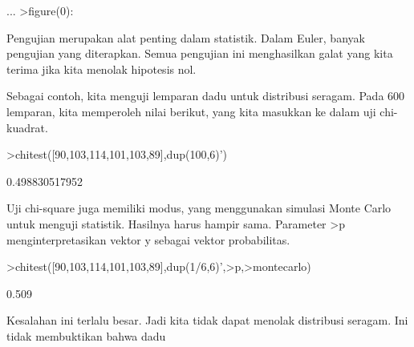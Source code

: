 \documentclass[a4paper,10pt]{article}
\begin{document}
\begin{eulernotebook}
\begin{eulercomment}
\begin{eulercomment}
\begin{eulercomment}
\begin{eulercomment}
\begin{eulercomment}
\begin{eulercomment}
\begin{eulercomment}
\begin{eulercomment}
\begin{eulercomment}
\begin{eulercomment}
\begin{eulercomment}
\begin{eulercomment}
\begin{eulercomment}
\begin{eulercomment}
\begin{eulercomment}
\begin{eulercomment}
\begin{eulercomment}
\begin{eulercomment}
\begin{eulercomment}
\begin{eulercomment}
\begin{eulercomment}
\begin{eulercomment}
\begin{eulercomment}
\begin{eulercomment}
\begin{eulercomment}
\begin{eulercomment}
\begin{eulercomment}
\begin{eulercomment}
\begin{eulercomment}
\begin{eulercomment}
\begin{eulercomment}
\begin{eulercomment}
\begin{eulercomment}
\begin{eulercomment}
\begin{eulercomment}
\begin{eulercomment}
\begin{eulercomment}
\begin{eulercomment}
\begin{eulercomment}
\begin{eulercomment}
\begin{eulercomment}
\begin{eulercomment}
\begin{eulercomment}
\begin{eulercomment}
\begin{eulercomment}
\begin{eulercomment}
\begin{eulercomment}
\begin{eulercomment}
\begin{eulercomment}
\begin{eulercomment}
\begin{eulercomment}
\begin{eulercomment}
\begin{eulercomment}
\begin{eulercomment}
\begin{eulercomment}
\begin{eulercomment}
\begin{eulercomment}
\begin{eulercomment}
\begin{eulercomment}
\begin{eulercomment}
\begin{eulercomment}
\begin{eulercomment}
\begin{eulercomment}
\begin{eulercomment}
\begin{eulercomment}
\begin{eulercomment}
\begin{eulerprompt}
...
>figure(0):
\end{eulerprompt}
\begin{eulercomment}
Pengujian merupakan alat penting dalam statistik. Dalam Euler, banyak
pengujian yang diterapkan. Semua pengujian ini menghasilkan galat yang
kita terima jika kita menolak hipotesis nol.

Sebagai contoh, kita menguji lemparan dadu untuk distribusi seragam.
Pada 600 lemparan, kita memperoleh nilai berikut, yang kita masukkan
ke dalam uji chi-kuadrat.
\end{eulercomment}
\begin{eulerprompt}
>chitest([90,103,114,101,103,89],dup(100,6)')
\end{eulerprompt}
\begin{euleroutput}
  0.498830517952
\end{euleroutput}
\begin{eulercomment}
Uji chi-square juga memiliki modus, yang menggunakan simulasi Monte
Carlo untuk menguji statistik. Hasilnya harus hampir sama. Parameter
\textgreater{}p menginterpretasikan vektor y sebagai vektor probabilitas.
\end{eulercomment}
\begin{eulerprompt}
>chitest([90,103,114,101,103,89],dup(1/6,6)',>p,>montecarlo)
\end{eulerprompt}
\begin{euleroutput}
  0.509
\end{euleroutput}
\begin{eulercomment}
Kesalahan ini terlalu besar. Jadi kita tidak dapat menolak distribusi
seragam. Ini tidak membuktikan bahwa dadu 
\end{eulercomment}
\end{eulercomment}
\end{eulercomment}
\end{eulercomment}
\end{eulercomment}
\end{eulercomment}
\end{eulercomment}
\end{eulercomment}
\end{eulercomment}
\end{eulercomment}
\end{eulercomment}
\end{eulercomment}
\end{eulercomment}
\end{eulercomment}
\end{eulercomment}
\end{eulercomment}
\end{eulercomment}
\end{eulercomment}
\end{eulercomment}
\end{eulercomment}
\end{eulercomment}
\end{eulercomment}
\end{eulercomment}
\end{eulercomment}
\end{eulercomment}
\end{eulercomment}
\end{eulercomment}
\end{eulercomment}
\end{eulercomment}
\end{eulercomment}
\end{eulercomment}
\end{eulercomment}
\end{eulercomment}
\end{eulercomment}
\end{eulercomment}
\end{eulercomment}
\end{eulercomment}
\end{eulercomment}
\end{eulercomment}
\end{eulercomment}
\end{eulercomment}
\end{eulercomment}
\end{eulercomment}
\end{eulercomment}
\end{eulercomment}
\end{eulercomment}
\end{eulercomment}
\end{eulercomment}
\end{eulercomment}
\end{eulercomment}
\end{eulercomment}
\end{eulercomment}
\end{eulercomment}
\end{eulercomment}
\end{eulercomment}
\end{eulercomment}
\end{eulercomment}
\end{eulercomment}
\end{eulercomment}
\end{eulercomment}
\end{eulercomment}
\end{eulercomment}
\end{eulercomment}
\end{eulercomment}
\end{eulercomment}
\end{eulercomment}
\end{eulercomment}
\end{eulernotebook}
\end{document}

